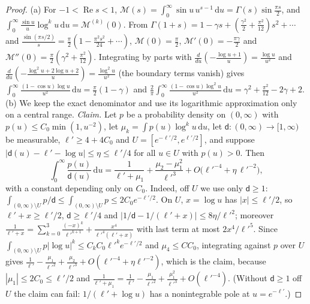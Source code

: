 \documentclass[11pt]{amsart}
\newcommand{\dd}{\,\mathrm{d}}
\DeclareMathOperator{\re}{Re}
\theoremstyle{definition}
\theoremstyle{remark}
\numberwithin{equation}{section}
\begin{document}
\begin{proof}
(a) For $-1<\re s<1$, $\mathcal M(s)=\int_0^\infty\sin u\,u^{s-1}\dd u=\Gamma(s)\sin\frac{\pi s}2$, and $\int_0^\infty\frac{\sin u}u\log^ku\dd u=\mathcal M^{(k)}(0)$. From $\Gamma(1+s)=1-\gamma s+(\frac{\gamma^2}2+\frac{\pi^2}{12})s^2+\cdots$ and $\frac{\sin(\pi s/2)}s=\frac\pi2(1-\frac{\pi^2s^2}{24}+\cdots)$, $\mathcal M(0)=\frac\pi2$, $\mathcal M'(0)=-\frac{\pi\gamma}2$ and $\mathcal M''(0)=\frac\pi2(\gamma^2+\frac{\pi^2}{12})$. Integrating by parts with $\frac d{du}(-\frac{\log u+1}u)=\frac{\log u}{u^2}$ and $\frac d{du}(-\frac{\log^2u+2\log u+2}u)=\frac{\log^2u}{u^2}$ (the boundary terms vanish) gives $\int_0^\infty\frac{(1-\cos u)\log u}{u^2}\dd u=\frac\pi2(1-\gamma)$ and $\frac2\pi\int_0^\infty\frac{(1-\cos u)\log^2u}{u^2}\dd u=\gamma^2+\frac{\pi^2}{12}-2\gamma+2$. (b) We keep the exact denominator and use its logarithmic approximation only on a central range. \emph{Claim.} Let $p$ be a probability density on $(0,\infty)$ with $p(u)\le C_0\min(1,u^{-2})$, let $\mu_k=\int p(u)\log^ku\dd u$, let $\mathsf d:(0,\infty)\to[1,\infty)$ be measurable, $\ell'\ge4+4C_0$ and $U=[e^{-\ell'/2},e^{\ell'/2}]$, and suppose $|\mathsf d(u)-\ell'-\log u|\le\eta\le\ell'/4$ for all $u\in U$ with $p(u)>0$. Then
\[
\int_0^\infty\frac{p(u)}{\mathsf d(u)}\dd u=\frac1{\ell'+\mu_1}+\frac{\mu_2-\mu_1^2}{\ell'^3}+O\bigl(\ell'^{-4}+\eta\,\ell'^{-2}\bigr),
\]
with a constant depending only on $C_0$. Indeed, off $U$ we use only $\mathsf d\ge1$: $\int_{(0,\infty)\setminus U}p/\mathsf d\le\int_{(0,\infty)\setminus U}p\le2C_0e^{-\ell'/2}$. On $U$, $x=\log u$ has $|x|\le\ell'/2$, so $\ell'+x\ge\ell'/2$, $\mathsf d\ge\ell'/4$ and $|1/\mathsf d-1/(\ell'+x)|\le8\eta/\ell'^2$; moreover $\frac1{\ell'+x}=\sum_{k=0}^3\frac{(-x)^k}{\ell'^{k+1}}+\frac{x^4}{\ell'^4(\ell'+x)}$ with last term at most $2x^4/\ell'^5$. Since $\int_{(0,\infty)\setminus U}p|\log u|^k\le C_kC_0\ell'^ke^{-\ell'/2}$ and $\mu_4\le CC_0$, integrating against $p$ over $U$ gives $\frac1{\ell'}-\frac{\mu_1}{\ell'^2}+\frac{\mu_2}{\ell'^3}+O(\ell'^{-4}+\eta\ell'^{-2})$, which is the claim, because $|\mu_1|\le2C_0\le\ell'/2$ and $\frac1{\ell'+\mu_1}=\frac1{\ell'}-\frac{\mu_1}{\ell'^2}+\frac{\mu_1^2}{\ell'^3}+O(\ell'^{-4})$. (Without $\mathsf d\ge1$ off $U$ the claim can fail: $1/(\ell'+\log u)$ has a nonintegrable pole at $u=e^{-\ell'}$.)


\end{proof}
\end{document}
